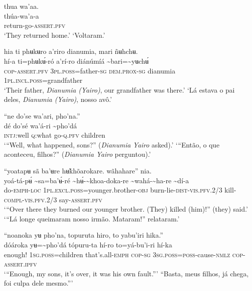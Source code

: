 \documentclass[output=paper,
modfonts,nonflat
]{langsci/langscibook}
\begin{document}
\ea thua wa'aa. \\[.3em]
\gll thúa-wa'a-a \\
     return-go-\textsc{assert.pfv}\\
\glt ‘They returned home.’
\glt ‘Voltaram.’
\z 

\ea hia ti phʉkʉro a’riro dianumia, mari ñʉhchʉ. \\[.3em]
\gll hí-a	ti=phʉkʉ́-ró	a’rí-ro	diánúmíá	{\textasciitilde}bari={\textasciitilde}yʉchʉ́ \\
     \textsc{cop-assert.pfv}	3\textsc{pl.poss}=father\textsc{-sg}	\textsc{dem.prox-sg}	dianumia	1\textsc{pl.incl.poss}=grandfather \\
\glt ‘Their father, \textit{Dianumia (Yairo)}, our grandfather was there.’
\glt ‘Lá estava o pai deles, \textit{Dianumia (Yairo)}, nosso avô.’
\z 

\ea “ne do'se wa'ari, pho'na.”  \\[.3em]
\gll {\textasciitilde}dé	do'sé	wa'á-ri	{\textasciitilde}pho'dá \\
     \textsc{intj:}well	\textsc{q:}what	go-\textsc{q.pfv}	children\\
\glt ‘“Well, what happened, sons?” (\textit{Dianumia Yairo} asked).’
\glt ‘“Então, o que aconteceu, filhos?” (\textit{Dianumia Yairo} perguntou).’
\z

\ea “yoatapʉ sã ba'ʉre hʉ̃khõarokare. wãhahare” nia. \\[.3em]
\gll yoá-tá-pʉ́	{\textasciitilde}sa=ba'ʉ́-ré	{\textasciitilde}hʉ́-{\textasciitilde}khoa-doka-re	{\textasciitilde}wahá-{\textasciitilde}ha-re	{\textasciitilde}dí-a \\
     do-\textsc{emph-loc}	1\textsc{pl.excl.poss}=younger.brother\textsc{-obj}	burn-lie-\textsc{dist-vis.pfv.}2/3	kill-\textsc{compl-vis.pfv.}2/3	say-\textsc{assert.pfv}\\
\glt ‘“Over there they burned our younger brother. (They) killed (him)!” (they) said.’
\glt ‘“Lá longe queimaram nosso irmão. Mataram!” relataram.’
\z 

\ea “noanoka yʉ pho'na, topuruta hiro, to yabu'iri hika.”  \\[.3em]
\gll {\textasciitilde}dóároka	yʉ={\textasciitilde}pho'dá	tópuru-ta	hí-ro	to=yá-bu'i-ri	hí-ka \\
     enough!	1\textsc{sg.poss}=children	that's.all-\textsc{emph}	\textsc{cop-sg}	3\textsc{sg.poss=poss}-cause-\textsc{nmlz}	\textsc{cop-assert.ipfv}\\
\glt ‘“Enough, my sons, it's over, it was his own fault.”’ 
\glt “Basta, meus filhos, já chega, foi culpa dele mesmo.”’
\z 
\end{document}
